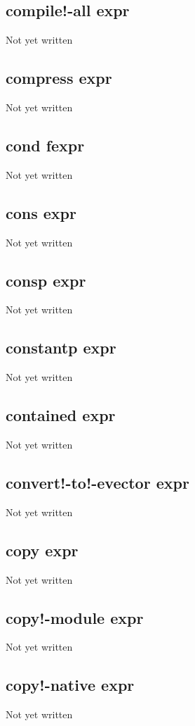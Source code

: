 \documentclass[a4paper,11pt]{article}
\begin{document}
\subsection{\ttfamily compile!-all expr}
Not yet written

\subsection{\ttfamily compress expr}
Not yet written

\subsection{\ttfamily cond fexpr}
Not yet written

\subsection{\ttfamily cons expr}
Not yet written

\subsection{\ttfamily consp expr}
Not yet written

\subsection{\ttfamily constantp expr}
Not yet written

\subsection{\ttfamily contained expr}
Not yet written

\subsection{\ttfamily convert!-to!-evector expr}
Not yet written

\subsection{\ttfamily copy expr}
Not yet written

\subsection{\ttfamily copy!-module expr}
Not yet written

\subsection{\ttfamily copy!-native expr}
Not yet written
\end{document}
